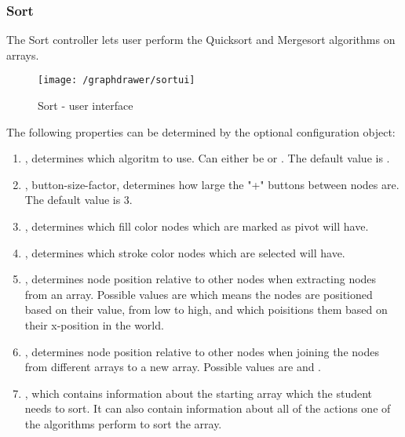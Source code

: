 \subsubsection{Sort}
The Sort controller lets user perform the Quicksort and Mergesort algorithms on arrays.
\begin{figure}[H]
    \centering
    \texttt{[image: /graphdrawer/sortui]}
    \caption{Sort - user interface}
    \label{fig:graphdrawerSortUserInterface}
\end{figure}
The following properties can be determined by the optional configuration object:
\begin{enumerate}
    \item {}, determines which algoritm to use. Can either be  or . The default value is .
    \item {}, button-size-factor, determines how large the "+" buttons between nodes are. The default value is 3.
    \item {}, determines which fill color nodes which are marked as pivot will have.
    \item {}, determines which stroke color nodes which are selected will have.
    \item {}, determines node position relative to other nodes when extracting nodes from an array. Possible values are  which means the nodes are positioned based on their value, from low to high, and  which poisitions them based on their x-position in the world.
    \item {}, determines node position relative to other nodes when joining the nodes from different arrays to a new array. Possible values are  and .
    \item {}, which contains information about the starting array which the student needs to sort. It can also contain information about all of the actions one of the algorithms perform to sort the array.
\end{enumerate}
